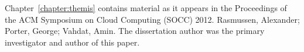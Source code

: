 Chapter~\ref{chapter:themis} contains material as it appears in the
Proceedings of the ACM Symposium on Cloud Computing (SOCC) 2012. Rasmussen,
Alexander; Porter, George; Vahdat, Amin. The dissertation author was the
primary investigator and author of this paper.
